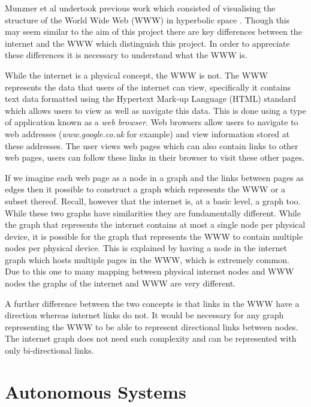 \label{sec:LitReviewWWW}
Munzner et al undertook previous work which consisted of visualising the structure of the World Wide Web (WWW) in hyperbolic space \cite{munzner_visualizing_1995}. Though this may seem similar to the aim of this project there are key differences between the internet and the WWW which distinguish this project. In order to appreciate these differences it is necessary to understand what the WWW is. 

While the internet is a physical concept, the WWW is not. The WWW represents the data that users of the internet can view, specifically it contains text data formatted using the Hypertext Mark-up Language (HTML) standard which allows users to view as well as navigate this data. This is done using a type of application known as a \textit{web browser}. Web browsers allow users to navigate to web addresses (\textit{www.google.co.uk} for example) and view information stored at these addresses. The user views web pages which can also contain links to other web pages, users can follow these links in their browser to visit these other pages. 

If we imagine each web page as a node in a graph and the links between pages as edges then it possible to construct a graph which represents the WWW or a subset thereof. Recall, however that the internet is, at a basic level, a graph too. While these two graphs have similarities they are fundamentally different. While the graph that represents the internet contains at most a single node per physical device, it is possible for the graph that represents the WWW to contain multiple nodes per physical device. This is explained by having a node in the internet graph which hosts multiple pages in the WWW, which is extremely common. Due to this one to many mapping between physical internet nodes and WWW nodes the graphs of the internet and WWW are very different. 

A further difference between the two concepts is that links in the WWW have a direction whereas internet links do not. It would be necessary for any graph representing the WWW to be able to represent directional links between nodes.  The internet graph does not need such complexity and can be represented with only bi-directional links. 

\section{Autonomous Systems}
\label{sec:LitReviewAutSystems}

